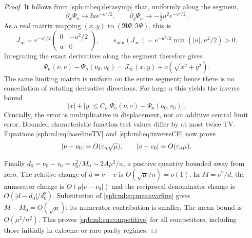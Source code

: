 \begin{proof}
It follows from \eqref{spb:ml:eq:derasymp} that, uniformly along the segment,
\[
 \partial_x\Psi_n\to\ii u e^{-u^2/2},\qquad
 \partial_y\Psi_n\to-\tfrac12u^2e^{-u^2/2}.
\]
As a real matrix mapping $(x,y)$ to $(\Re\Psi,\Im\Psi)$, this is
\begin{equation}\label{spb:ml:eq:Jacobian}
 J_\infty=e^{-u^2/2}
 \begin{pmatrix}0&-u^2/2\\u&0\end{pmatrix},\qquad
 s_{\min}(J_\infty)=e^{-u^2/2}\min(|u|,u^2/2)>0.
\end{equation}
Integrating the exact derivatives along the segment therefore gives
\[
 \Psi_n(\nu,v)-\Psi_n(\nu_0,v_0)
      =J_\infty(x,y)+o(\sqrt{x^2+y^2}).
\]
The same limiting matrix is uniform on the entire segment; hence there is no cancellation of rotating derivative directions. For large $n$ this yields the inverse bound
\begin{equation}\label{spb:ml:eq:inverseCF}
 |x|+|y|\le C_u|\Psi_n(\nu,v)-\Psi_n(\nu_0,v_0)|.
\end{equation}
Crucially, the error is multiplicative in displacement, not an additive central limit error. Bounded characteristic function test values differ by at most twice TV. Equations \eqref{spb:ml:eq:baselineTV} and \eqref{spb:ml:eq:inverseCF} now prove
\begin{equation}\label{spb:ml:eq:meanvarfine}
 |\nu-\nu_0|=O(\varepsilon_n\sqrt\mu),\qquad
 |v-v_0|=O(\varepsilon_n\mu).
\end{equation}

Finally $d_0=\nu_0-v_0=\nu_0^2/M_0\sim2A\mu^2/n$, a positive quantity bounded away from zero. The relative change of $d=\nu-v$ is $O(\sqrt\mu/n)=o(1)$. In $M=\nu^2/d$, the numerator change is $O(\mu|\nu-\nu_0|)$ and the reciprocal denominator change is $O(|d-d_0|/d_0^2)$. Substitution of \eqref{spb:ml:eq:meanvarfine} gives $M-M_0=O(\sqrt\mu)$; its numerator contribution is smaller. The mean bound is $O(\mu^2/n^2)$. This proves \eqref{spb:ml:eq:competitive} for all competitors, including those initially in extreme or rare parity regimes.
\end{proof}

